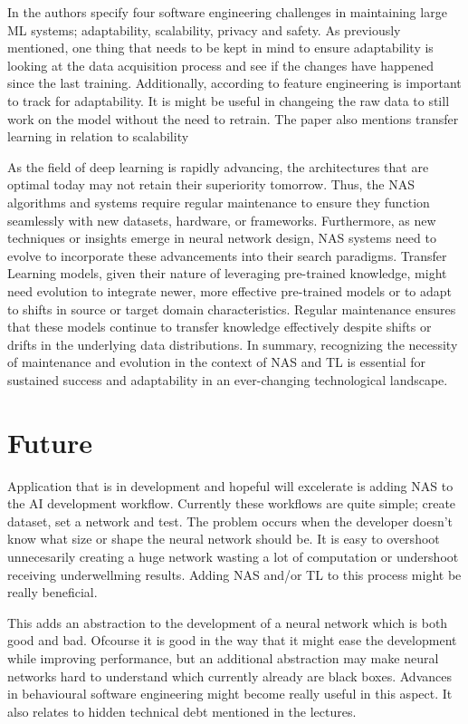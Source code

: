 \documentclass[11pt,a4paper]{article}
\begin{document}
In \cite{industry} the authors specify four software engineering challenges in maintaining large ML systems; adaptability, scalability, privacy and safety. As previously mentioned, one thing that needs to be kept in mind to ensure adaptability is looking at the data acquisition process and see if the changes have happened since the last training. Additionally, according to \cite{industry} feature engineering is important to track for adaptability. It is might be useful in changeing the raw data to still work on the model without the need to retrain. The paper also mentions transfer learning in relation to scalability 


As the field of deep learning is rapidly advancing, the architectures that are optimal today may not retain their superiority tomorrow. Thus, the NAS algorithms and systems require regular maintenance to ensure they function seamlessly with new datasets, hardware, or frameworks. Furthermore, as new techniques or insights emerge in neural network design, NAS systems need to evolve to incorporate these advancements into their search paradigms. Transfer Learning models, given their nature of leveraging pre-trained knowledge, might need evolution to integrate newer, more effective pre-trained models or to adapt to shifts in source or target domain characteristics. Regular maintenance ensures that these models continue to transfer knowledge effectively despite shifts or drifts in the underlying data distributions. In summary, recognizing the necessity of maintenance and evolution in the context of NAS and TL is essential for sustained success and adaptability in an ever-changing technological landscape.



\section*{Future}
Application that is in development and hopeful will excelerate is adding NAS to the AI development workflow. Currently these workflows are quite simple; create dataset, set a network and test. The problem occurs when the developer doesn't know what size or shape the neural network should be. It is easy to overshoot unnecesarily creating a huge network wasting a lot of computation or undershoot receiving underwellming results. Adding NAS and/or TL to this process might be really beneficial.

This adds an abstraction to the development of a neural network which is both good and bad. Ofcourse it is good in the way that it might ease the development while improving performance, but an additional abstraction may make neural networks hard to understand which currently already are black boxes. Advances in behavioural software engineering might become really useful in this aspect. It also relates to hidden technical debt mentioned in the lectures.
\end{document}
